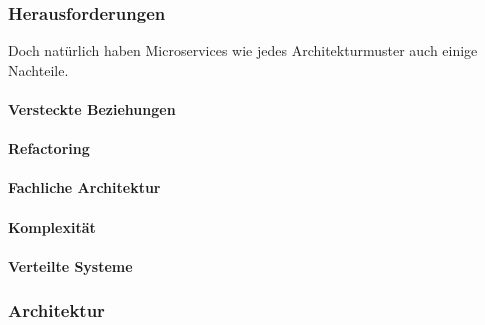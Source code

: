 \subsubsection{Herausforderungen}

Doch natürlich haben Microservices wie jedes Architekturmuster auch einige Nachteile.

\paragraph{Versteckte Beziehungen}

\paragraph{Refactoring}

\paragraph{Fachliche Architektur}

\paragraph{Komplexität}

\paragraph{Verteilte Systeme}

\subsubsection{Architektur}

